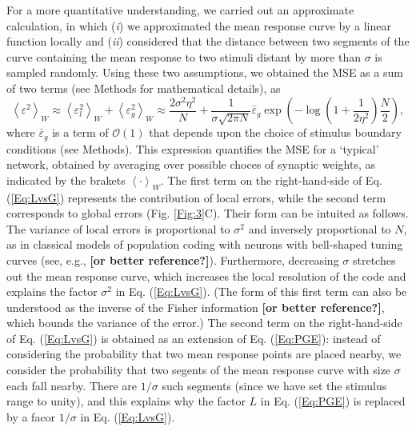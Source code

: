 \documentclass[a4paper]{article}%
\begin{document}
For a more quantitative understanding, we carried out an approximate
calculation, in which (\textit{i}) we approximated the mean response curve by
a linear function locally and (\textit{ii}) considered that the distance
between two segments of the curve containing the mean response to two stimuli
distant by more than $\sigma$ is sampled randomly. Using these two
assumptions, we obtained the MSE as a sum of two terms (see Methods for
mathematical details), as
\begin{equation}
\left\langle \varepsilon^{2}\right\rangle _{W}\approx\left\langle
\varepsilon_{l}^{2}\right\rangle _{W}+\left\langle \varepsilon_{g}%
^{2}\right\rangle _{W}\approx\frac{2\sigma^{2}\eta^{2}}{N}+\frac{1}%
{\sigma\sqrt{2\pi N}}\bar{\varepsilon}_{g}\exp\left(  {-\log}\left(
{1+\frac{1}{2\eta^{2}}}\right)  \frac{N}{2}\right)  ,\label{Eq:LvsG}%
\end{equation}
where $\bar{\varepsilon}_{g}$ is a term of $\mathcal{O}\left(  1\right)  $
that depends upon the choice of stimulus boundary conditions (see Methods).
This expression quantifies the MSE for a `typical' network, obtained by
averaging over possible choces of synaptic weights, as indicated by the
brakets $\left\langle \cdot\right\rangle _{W}$. The first term on the
right-hand-side of Eq. (\ref{Eq:LvsG}) represents the contribution of local
errors, while the second term corresponds to global errors (Fig.
\ref{Fig:3}C). Their form can be intuited as follows. The variance of local
errors is proportional to $\sigma^{2}$ and inversely proportional to $N$, as
in classical models of population coding with neurons with bell-shaped tuning
curves (see, e.g., \cite{Seung1993SimpleCodes} \textbf{[or better
reference?]}). Furthermore, decreasing $\sigma$ stretches out the mean
response curve, which increases the local resolution of the code and explains
the factor $\sigma^{2}$ in Eq. (\ref{Eq:LvsG}). (The form of this first term
can also be understood as the inverse of the Fisher information
\cite{Seung1993SimpleCodes} \textbf{[or better reference?]}, which bounds the
variance of the error.) The second term on the right-hand-side of Eq.
(\ref{Eq:LvsG}) is obtained as an extension of Eq. (\ref{Eq:PGE}): instead of
considering the probability that two mean response points are placed nearby,
we consider the probability that two segents of the mean response curve with
size $\sigma$ each fall nearby. There are $1/\sigma$ such segments (since we
have set the stimulus range to unity), and this explains why the factor $L$ in
Eq. (\ref{Eq:PGE}) is replaced by a facor $1/\sigma$ in Eq. (\ref{Eq:LvsG}).
\end{document}
